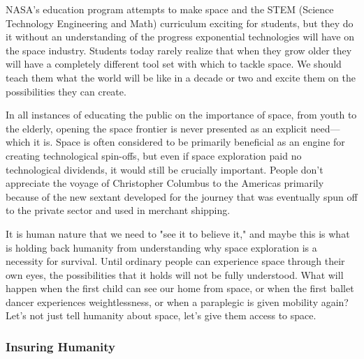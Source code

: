 NASA's  education program attempts to make space and the STEM (Science  Technology Engineering and Math) curriculum exciting for students, but  they do it without an understanding of the progress exponential  technologies will have on the space industry. Students today rarely  realize that when they grow older they will have a completely different  tool set with which to tackle space. We should teach them what the world  will be like in a decade or two and excite them on the possibilities  they can create.

In  all instances of educating the public on the importance of space, from  youth to the elderly, opening the space frontier is never presented as  an explicit need---which it is. Space is often considered to be  primarily beneficial as an engine for creating technological spin-offs,  but even if space exploration paid no technological dividends, it would  still be crucially important. People don't appreciate the voyage of  Christopher Columbus to the Americas primarily because of the new  sextant developed for the journey that was eventually spun off to the  private sector and used in merchant shipping.

It is human nature that we need to  "see it to believe it," and maybe this is what is holding back humanity  from understanding why space exploration is a necessity for survival.  Until ordinary people can experience space through their own eyes, the  possibilities that it holds will not be fully understood. What will  happen when the first child can see our home from space, or when the  first ballet dancer experiences weightlessness, or when a paraplegic is  given mobility again? Let's not just tell humanity about space, let's  give them access to space.


\subsubsection{Insuring Humanity}

